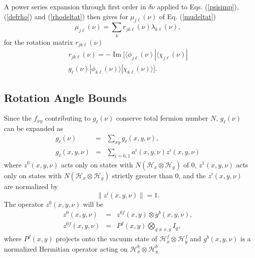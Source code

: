 \documentclass[twocolumn,amsmath,amssymb]{revtex4-1}
\begin{document}
A power series expansion through first order in 
$\delta \nu$ applied to Eqs. (\ref{psisimp}), (\ref{defrho}) and (\ref{rhodeltat})
then gives for $\mu_{j\ell}(\nu)$ of Eq. (\ref{mudeltat})
\begin{equation}
\label{ufromperturb}
\mu_{j\ell}(\nu) = \sum_k r_{jk\ell}(\nu) \lambda_{k\ell}(\nu), 
\end{equation}
for the rotation matrix $r_{jk\ell}(\nu)$
\begin{multline}
\label{rijp}
r_{jk\ell}(\nu) = 
 -\operatorname{Im}[  \langle \phi_{j\ell}(\nu)| \langle \chi_{j\ell}(\nu)| \\
g_{\ell}(\nu)|\phi_{k\ell}(\nu) \rangle |\chi_{k\ell}(\nu) \rangle ].
\end{multline}



\subsection{\label{subsec:anglebounds} Rotation Angle Bounds}

Since the $f_{xy}$ contributing to $g_\ell(\nu)$
conserve total fermion number $N$,
$g_\ell(\nu)$ can be expanded as
\begin{subequations}
\begin{eqnarray}
\label{expandg}
g_{\ell}(\nu) &=& \sum_{xy} g_{\ell}( x, y, \nu),\\
\label{expandg1}
g_{\ell}(x,y,\nu) &=& \sum_{i = 0,1} a^i(x, y, \nu) z^i(x, y, \nu)
\end{eqnarray}
\end{subequations}
where $z^0( x, y, \nu)$ acts only on states
with $N( \mathcal{H}_x \otimes \mathcal{H}_y)$ of 0,
$z^1( x, y, \nu)$ acts only on states
with $N( \mathcal{H}_x \otimes \mathcal{H}_y)$ strictly greater than 0,
and the $z^i(x,y,\nu)$ are normalized by 
\begin{equation}
\label{normzi}
\parallel z^i(x, y, \nu) \parallel   =  1.
\end{equation}
The operator
$z^0(x, y, \nu)$ will be
\begin{subequations}
\begin{eqnarray}
\label{zprojection}
z^0(x,y,\nu) &=& z^{0f}(x,y) \otimes g^b(x,y,\nu), \\
z^{0f}(x,y,\nu) &=& P^f(x,y) \bigotimes_{q \ne x,y} I_q,
\end{eqnarray}
\end{subequations}
where $P^f(x,y)$ projects onto the vacuum state
of $\mathcal{H}^f_x \otimes \mathcal{H}^f_y$
and $g^b(x,y,\nu)$ is a normalized Hermitian
operator acting on $\mathcal{H}^b_x \otimes \mathcal{H}^b_y$
\end{document}
